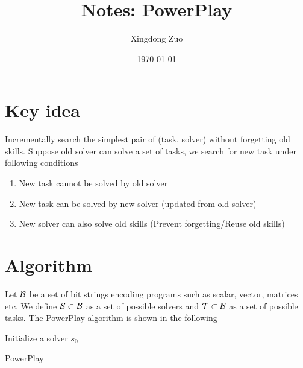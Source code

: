 \documentclass{article}
\title{Notes: PowerPlay \cite{schmidhuber2013powerplay}}
\author{Xingdong Zuo}
\affil[]{IDSIA, Switzerland}
\date{\today}
\begin{document}
\maketitle

\section{Key idea}
Incrementally search the simplest pair of (task, solver) without forgetting old skills.
Suppose old solver can solve a set of tasks, we search for new task under following conditions
\begin{enumerate}
    \item New task cannot be solved by old solver
    \item New task can be solved by new solver (updated from old solver)
    \item New solver can also solve old skills (Prevent forgetting/Reuse old skills)
\end{enumerate}

\section{Algorithm}
Let $\mathcal{B}$ be a set of bit strings encoding programs such as scalar, vector, matrices etc. We define $\mathcal{S}\subset\mathcal{B}$ as a set of possible solvers and $\mathcal{T}\subset\mathcal{B}$ as a set of possible tasks. The PowerPlay algorithm is shown in the following

\begin{algorithm}[H]
\SetAlgoNoLine
    Initialize a solver $s_0$\\
    \caption{PowerPlay}
    \label{algo:powerplay}
\end{algorithm}

\printbibliography
\end{document}
